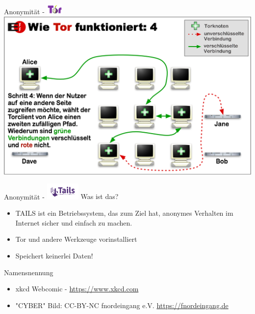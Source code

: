 \documentclass{beamer}
\begin{document}
\begin{frame}{Anonymität - \includegraphics[align=c,height=1.5em]{tor.jpg}}
    \centering\includegraphics[height=0.7\textheight]{tor4.png}
\end{frame}

\begin{frame}{Anonymität - \includegraphics[align=c,height=2.3em]{tails.png}}
	Was ist das?
	\begin{itemize}
		\item TAILS ist ein Betriebssystem, das zum Ziel hat, anonymes Verhalten im Internet sicher und einfach zu machen.
		\item Tor und andere Werkzeuge vorinstalliert
                \item Speichert keinerlei Daten!
	\end{itemize}
\end{frame}

\begin{frame}{Namensnennung}
	\begin{itemize}
        \item xkcd Webcomic - \url{https://www.xkcd.com}
        \item "CYBER" Bild: CC-BY-NC fnordeingang e.V. \url{https://fnordeingang.de}
    \end{itemize}
\end{frame}
\end{document}

